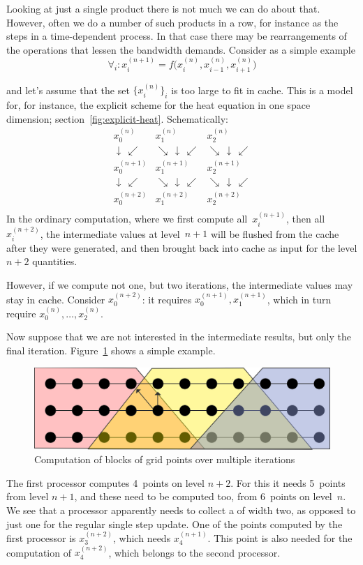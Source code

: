 Looking at just a
single product there is not much we can do about that. 
However, 
often we do a number of such products in a row, for instance as the steps
in a time-dependent process. In that case there may be rearrangements
of the operations that lessen the bandwidth demands. Consider as a simple example
\begin{equation}
\forall_i\colon x^{(n+1)}_i = f\bigl( x^{(n)}_i, x^{(n)}_{i-1}, x^{(n)}_{i+1} \bigr)
\label{eq:3p-average}
\end{equation}

and let's assume that the set $\{x^{(n)}_i\}_i$ is too large to fit 
in cache.
This is a model for, for instance, the explicit scheme for the heat
equation in one space dimension; section~\ref{fig:explicit-heat}.
Schematically:
\[
\begin{array}{ccccc}
  x^{(n)}_0&x^{(n)}_1&x^{(n)}_2\\
  \downarrow\,\swarrow&\searrow\,\downarrow\,\swarrow&\searrow\,\downarrow\,\swarrow\\
  x^{(n+1)}_0&x^{(n+1)}_1&x^{(n+1)}_2\\
  \downarrow\,\swarrow&\searrow\,\downarrow\,\swarrow&\searrow\,\downarrow\,\swarrow\\
  x^{(n+2)}_0&x^{(n+2)}_1&x^{(n+2)}_2\\
\end{array}
\]
In the ordinary computation, where we first compute all~$x^{(n+1)}_i$, 
then all~$x^{(n+2)}_i$, the intermediate values at level~$n+1$
will be flushed from the cache
after they were generated, and then brought back into cache as input for the
level $n+2$ quantities.

However,
if we compute not one, but two iterations, the intermediate values
may stay in cache.
Consider $x^{(n+2)}_0$: it requires $x^{(n+1)}_0,x^{(n+1)}_1$,
which in turn require $x^{(n)}_0,\ldots,x^{(n)}_2$.

Now suppose that we are not interested in the intermediate results, but
only the final iteration. Figure~\ref{fig:grid-update-overlap} shows
a simple example.
\begin{figure}[ht]
\includegraphics[scale=.1]{graphics/grid-update-overlap}
\caption{Computation of blocks of grid points over multiple iterations}
\label{fig:grid-update-overlap}
\end{figure}
The first processor computes 4~points on level $n+2$. For this it needs 5~points
from level $n+1$, and these need to be computed too, from 6~points on level~$n$.
We see that a processor apparently needs to collect a 
of width two, as opposed to just one for the regular single step update.
One of the points computed by the first processor is $x^{(n+2)}_3$,
which needs $x^{(n+1)}_4$. This point is also needed for the computation
of $x^{(n+2)}_4$, which belongs to the second processor.

